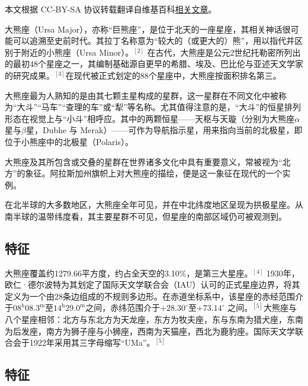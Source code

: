
本文根据 CC-BY-SA 协议转载翻译自维基百科\href{https://en.wikipedia.org/wiki/Ursa_Major}{相关文章}。

大熊座（Ursa Major），亦称“巨熊座”，是位于北天的一座星座，其相关神话很可能可以追溯至史前时代。其拉丁名称意为“较大的（或更大的）熊”，用以指代并区别于附近的小熊座（Ursa Minor）。$^{[2]}$ 在古代，大熊座是公元2世纪托勒密所列出的最初48个星座之一，其编制基础源自更早的希腊、埃及、巴比伦与亚述天文学家的研究成果。$^{[3]}$在现代被正式划定的88个星座中，大熊座按面积排名第三。

大熊座最为人熟知的是由其七颗主星构成的星群，这一星群在不同文化中被称为“大斗”“马车”“查理的车”或“犁”等名称。尤其值得注意的是，“大斗”的恒星排列形态在视觉上与“小斗”相呼应。其中的两颗恒星——天枢与天璇（分别为大熊座$\alpha$星与$\beta$星，Dubhe 与 Merak）——可作为导航指示星，用来指向当前的北极星，即位于小熊座中的北极星（Polaris）。

大熊座及其所包含或交叠的星群在世界诸多文化中具有重要意义，常被视为“北方”的象征。阿拉斯加州旗帜上对大熊座的描绘，便是这一象征在现代的一个实例。

在北半球的大多数地区，大熊座全年可见，并在中北纬度地区呈现为拱极星座。从南半球的温带纬度看，其主要星群不可见，但星座的南部区域仍可被观测到。
\subsection{特征}  
大熊座覆盖约1279.66平方度，约占全天空的3.10\%，是第三大星座。$^{[4]}$ 1930年，欧仁·德尔波特为其划定了国际天文学联合会（IAU）认可的正式星座边界，将其定义为一个由28条边组成的不规则多边形。在赤道坐标系中，该星座的赤经范围介于$08^{\mathrm h}08.3^{\mathrm m}$至$14^{\mathrm h}29.0^{\mathrm m}$之间，赤纬范围介于$+28.30^\circ$至$+73.14^\circ$ 之间。$^{[5]}$大熊座与八个星座相邻：北方与东北方为天龙座，东方为牧夫座，东与东南为猎犬座，东南为后发座，南方为狮子座与小狮座，西南为天猫座，西北为鹿豹座。国际天文学联合会于1922年采用其三字母缩写“UMa”。$^{[5]}$
\subsection{特征}  
